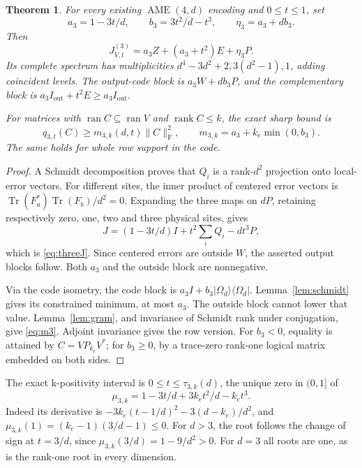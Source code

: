 \documentclass[11pt,a4paper]{article}
\newtheorem{theorem}{Theorem}
\newcommand{\Tr}{\operatorname{Tr}}
\newcommand{\ran}{\operatorname{ran}}
\newcommand{\F}{\mathrm F}
\DeclareMathOperator{\rank}{rank}
\begin{document}
\begin{theorem}\label{thm:three}
For every existing \(\operatorname{AME}(4,d)\) encoding and \(0\le t\le1\), set
\[
 a_3=1-3t/d,\qquad b_3=3t^2/d-t^3,\qquad \eta_3=a_3+db_3.
\]
Then
\begin{equation}\label{eq:threeJ}
 J^{(3)}_{V,t}=a_3Z+(a_3+t^2)E+\eta_3P.
\end{equation}
Its complete spectrum has multiplicities \(d^4-3d^2+2,3(d^2-1),1\), adding coincident levels. The output-code block is \(a_3W+db_3P\), and the complementary block is \(a_3I_{\mathrm{out}}+t^2E\ge a_3I_{\mathrm{out}}\).

For matrices with \(\ran C\subseteq\ran V\) and \(\rank C\le k\), the exact sharp bound is
\begin{equation}\label{eq:m3}
 q_{3,t}(C)\ge m_{3,k}(d,t)\|C\|_{\F}^{2},
 \qquad m_{3,k}=a_3+k_e\min(0,b_3).
\end{equation}
The same holds for whole row support in the code.
\end{theorem}
\begin{proof}
A Schmidt decomposition proves that \(Q_i\) is a rank-\(d^2\) projection onto local-error vectors. For different sites, the inner product of centered error vectors is \(\Tr(F_a^*)\Tr(F_b)/d^2=0\). Expanding the three maps on \(dP\), retaining respectively zero, one, two and three physical sites, gives
\[
 J=(1-3t/d)I+t^2\sum_iQ_i-dt^3P,
\]
which is \eqref{eq:threeJ}. Since centered errors are outside \(W\), the asserted output blocks follow. Both \(a_3\) and the outside block are nonnegative.

Via the code isometry, the code block is \(a_3I+b_3|\Omega_d\rangle\langle\Omega_d|\). Lemma~\ref{lem:schmidt} gives its constrained minimum, at most \(a_3\). The outside block cannot lower that value. Lemma~\ref{lem:gram}, and invariance of Schmidt rank under conjugation, give \eqref{eq:m3}. Adjoint invariance gives the row version. For \(b_3<0\), equality is attained by \(C=VP_{k_e}V^*\); for \(b_3\ge0\), by a trace-zero rank-one logical matrix embedded on both sides.
\end{proof}

The exact k-positivity interval is \(0\le t\le\tau_{3,k}(d)\), the unique zero in \((0,1]\) of
\begin{equation}\label{eq:mu3}
 \mu_{3,k}=1-3t/d+3k_et^2/d-k_et^3.
\end{equation}
Indeed its derivative is
\(-3k_e(t-1/d)^2-3(d-k_e)/d^2\), and \(\mu_{3,k}(1)=(k_e-1)(3/d-1)\le0\).
For \(d>3\), the root follows the change of sign at \(t=3/d\), since \(\mu_{3,k}(3/d)=1-9/d^2>0\). For \(d=3\) all roots are one, as is the rank-one root in every dimension.
\end{document}
